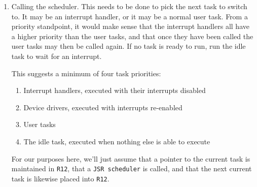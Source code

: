 \documentclass{gqtekspec}
\begin{document}
\begin{enumerate}
\item Calling the scheduler.  This needs to be done to pick the next task
	to switch to.  It may be an interrupt handler, or it may  be a normal
	user task.  From a priority standpoint, it would make sense that the
	interrupt handlers all have a higher priority than the user tasks,
	and that once they have been called the user tasks may then be called
	again.  If no task is ready to run, run the idle task to wait for an
	interrupt.

	This suggests a minimum of four task priorities:
	\begin{enumerate}
	\item Interrupt handlers, executed with their interrupts disabled
	\item Device drivers, executed with interrupts re-enabled
	\item User tasks
	\item The idle task, executed when nothing else is able to execute
	\end{enumerate}

	For our purposes here, we'll just assume that a pointer to the current
	task is maintained in {\tt R12}, that a {\tt JSR scheduler} is 
	called, and that the next current task is likewise placed into
	{\tt R12}.


\end{enumerate}
\end{document}
